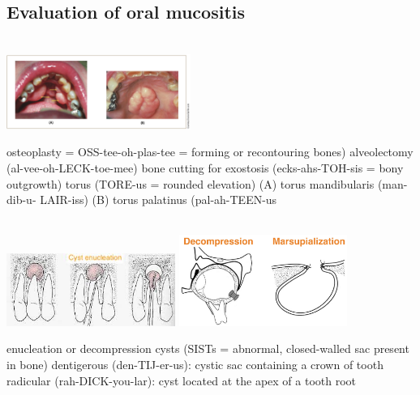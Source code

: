 \documentclass[
paper=landscape,
paper=160mm:90mm, %
fontsize=11pt, %
pagesize, %
parskip=half-, %
]{scrartcl} %
\newenvironment{WrapText1}[3][r]
{\wrapfigure[#2]{#1}{#3}}
{\endwrapfigure}
\newcommand{\wrapr}[6]{
\begin{minipage}{\linewidth}\mbox{}\\
\vspace{#1}
\begin{WrapText1}{#2}{#3}
\vspace{#4}#5\end{WrapText1}#6
\end{minipage}}
\theoremstyle{mythmstyle} %
\begin{document}
\clearpage

\subsection{Evaluation of oral mucositis}



\wrapr{-10mm}{7}{6cm}{+16mm}
{\includegraphics[width=6cm]{torus.png}}
{%
\begin{outline}
\1 osteoplasty = OSS-tee-oh-plas-tee = forming or recontouring bones)
\1 alveolectomy (al-vee-oh-LECK-toe-mee)
\1 bone cutting for
    \2 exostosis (ecks-ahs-TOH-sis = bony outgrowth)
    \2 torus (TORE-us = rounded elevation)
        \3 (A) torus mandibularis (man-dib-u- LAIR-iss)
        \3 (B) torus palatinus (pal-ah-TEEN-us
        
\end{outline}
} %


\clearpage

\wrapr{-8mm}{7}{6cm}{+8mm}
{%
\includegraphics[width=5.5cm]{enucleation.jpeg}
\includegraphics[width=5.5cm]{decompression.jpeg}
} %
{%
\begin{outline}
\1 enucleation or decompression
    \2 cysts (SISTs = abnormal, closed-walled sac present in bone)
    \3 dentigerous (den-TIJ-er-us): cystic sac containing a crown of tooth
    \3 radicular (rah-DICK-you-lar): cyst located at the apex of a tooth root
\end{outline}
} %
\end{document}
